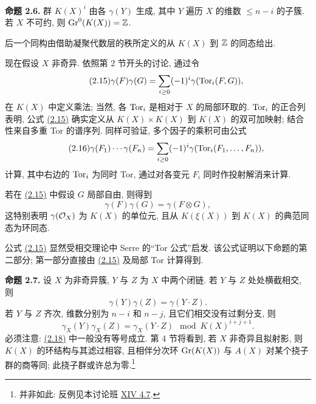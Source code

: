 \textbf{命题 2.6.} 群 $K(X)^i$ 由各 $\gamma(Y)$ 生成, 其中 $Y$ 遍历 $X$ 的维数 $\leq n-i$ 的子簇. 若 $X$ 不可约, 则 $\operatorname{Gr}^0(K(X))=\mathbb Z$.

后一个同构由借助凝聚代数层的秩所定义的从 $K(X)$ 到 $\mathbb Z$ 的同态给出.

现在假设 $X$ 非奇异. 依照第 2 节开头的讨论, 通过令
\begin{equation}\tag{2.15}
 \gamma(F)\gamma(G)=\sum_{i\geq 0}(-1)^i\gamma(\operatorname{Tor}_i(F,G)),
\end{equation}
在 $K(X)$ 中定义乘法; 当然, 各 $\operatorname{Tor}_i$ 是相对于 $X$ 的局部环取的. $\operatorname{Tor}_i$ 的正合列表明, 公式 \hyperlink{sga6.e00.eq.2-15}{(2.15)} 确实定义从 $K(X)\times K(X)$ 到 $K(X)$ 的双可加映射; 结合性来自多重 Tor 的谱序列. 同样可验证, 多个因子的乘积可由公式
\begin{equation}\tag{2.16}
 \gamma(F_1)\cdots\gamma(F_n)=\sum_{i\geq 0}(-1)^i\gamma(\operatorname{Tor}_i(F_1,\ldots,F_n)),
\end{equation}
计算, 其中右边的 $\operatorname{Tor}_i$ 为同时 Tor, 通过对各变元 $F_i$ 同时作投射解消来计算.

若在 \hyperlink{sga6.e00.eq.2-15}{(2.15)} 中假设 $G$ 局部自由, 则得到
\begin{equation}\tag{2.15 bis}
 \gamma(F)\gamma(G)=\gamma(F\otimes G),
\end{equation}
这特别表明 $\gamma(\mathcal O_X)$ 为 $K(X)$ 的单位元, 且从 $K(\xi(X))$ 到 $K(X)$ 的典范同态为环同态.

公式 \hyperlink{sga6.e00.eq.2-15}{(2.15)} 显然受相交理论中 Serre 的“Tor 公式”启发. 该公式证明以下命题的第二部分; 第一部分直接由 \hyperlink{sga6.e00.eq.2-15}{(2.15)} 及局部 Tor 计算得到.

\textbf{命题 2.7.} 设 $X$ 为非奇异簇, $Y$ 与 $Z$ 为 $X$ 中两个闭链. 若 $Y$ 与 $Z$ 处处横截相交, 则
\begin{equation}\tag{2.17}
 \gamma(Y)\gamma(Z)=\gamma(Y\cdot Z).
\end{equation}
若 $Y$ 与 $Z$ 齐次, 维数分别为 $n-i$ 和 $n-j$, 且它们相交没有过剩分支, 则
\begin{equation}\tag{2.18}
 \gamma_X(Y)\gamma_X(Z)=\gamma_X(Y\cdot Z)\mod K(X)^{i+j+1}.
\end{equation}
必须注意: \hyperlink{sga6.e00.eq.2-18}{(2.18)} 中一般没有等号成立. 第 4 节将看到, 若 $X$ 非奇异且拟射影, 则 $K(X)$ 的环结构与其滤过相容, 且相伴分次环 $\operatorname{Gr}(K(X))$ 与 $A(X)$ 对某个挠子群的商等同; 此挠子群或许总为零.\footnote{并非如此: 反例见本讨论班 \hyperlink{sga6.e14.para.4-7}{XIV 4.7}.}


